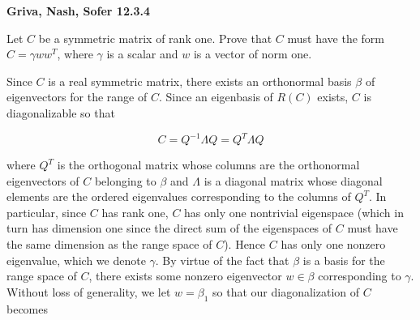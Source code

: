 \textbf{Griva, Nash, Sofer 12.3.4}

Let $C$ be a symmetric matrix of rank one. Prove that $C$ must have the form $C = \gamma w w^T$, where $\gamma$ is a 
scalar and $w$ is a vector of norm one.

\begin{solution}
    Since $C$ is a real symmetric matrix, there exists an orthonormal basis $\beta$ of eigenvectors for the range 
    of $C$. Since an eigenbasis of $R(C)$ exists, $C$ is diagonalizable so that

    $$
    C = Q^{-1} \Lambda Q = Q^T \Lambda Q
    $$

    where $Q^T$ is the orthogonal matrix whose columns are the orthonormal eigenvectors of $C$ belonging to $\beta$ and 
    $\Lambda$ is a diagonal matrix whose diagonal elements are the ordered eigenvalues corresponding to the columns of
    $Q^T$. In particular, since $C$ has rank one, $C$ has only one nontrivial eigenspace (which in turn has dimension 
    one since the direct sum of the eigenspaces of $C$ must have the same dimension as the range space of $C$). Hence 
    $C$ has only one nonzero eigenvalue, which we denote $\gamma$. By virtue of the fact that $\beta$ is a basis for 
    the range space of $C$, there exists some nonzero eigenvector $w \in \beta$ corresponding to $\gamma$. Without loss
    of generality, we let $w = \beta_1$ so that our diagonalization of $C$ becomes


\end{solution}

